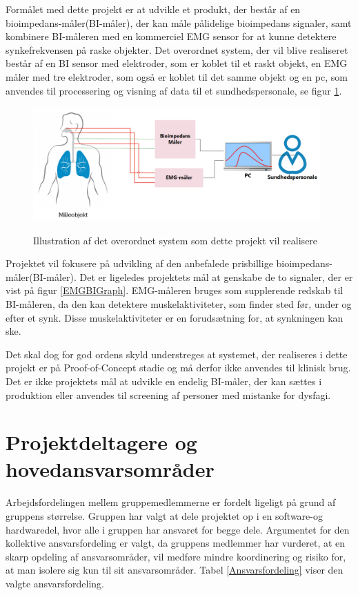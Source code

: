 Formålet med dette projekt er at udvikle et produkt, der består af en bioimpedans-måler(BI-måler), der kan måle pålidelige bioimpedans signaler, samt kombinere BI-måleren med en kommerciel EMG sensor for at kunne detektere synkefrekvensen på raske objekter. Det overordnet system, der vil blive realiseret består af en BI sensor med elektroder, som er koblet til et raskt objekt, en EMG måler med tre elektroder, som også er koblet til det samme objekt og en pc, som anvendes til processering og visning af data til et sundhedspersonale, se figur \ref{KonceptuelDiagram}.  

\begin{figure}[H]
\centering
{\includegraphics[width=11cm]
{Figure/KonceptuelDiagram}}
\caption{Illustration af  det overordnet system som dette projekt vil realisere}
\label{KonceptuelDiagram}
\end{figure}

Projektet vil fokusere på udvikling af den anbefalede prisbillige bioimpedans-måler(BI-måler). Det er ligeledes projektets mål at genskabe de to signaler, der er vist på figur \ref{EMGBIGraph}. EMG-måleren bruges som supplerende redskab til BI-måleren, da den kan detektere muskelaktiviteter, som finder sted før, under og efter et synk. Disse muskelaktiviteter er en forudsætning for, at synkningen kan ske. 

Det skal dog for god ordens skyld understreges at systemet, der realiseres i dette projekt er på Proof-of-Concept stadie og må derfor ikke anvendes til klinisk brug. Det er ikke projektets mål at udvikle en endelig BI-måler, der kan sættes i produktion eller anvendes til screening af personer med mistanke for dysfagi. 

\section{Projektdeltagere og hovedansvarsområder} 
Arbejdsfordelingen  mellem gruppemedlemmerne er fordelt ligeligt på grund af gruppens størrelse. Gruppen har valgt at dele projektet op i en software-og hardwaredel, hvor alle i gruppen har ansvaret for  begge dele. Argumentet for den kollektive ansvarsfordeling er valgt, da gruppens medlemmer har vurderet, at en skarp opdeling af ansvarsområder, vil medføre mindre koordinering og risiko for, at man isolere sig kun til sit ansvarsområder. Tabel \ref{Ansvarsfordeling} viser den valgte ansvarsfordeling. 


